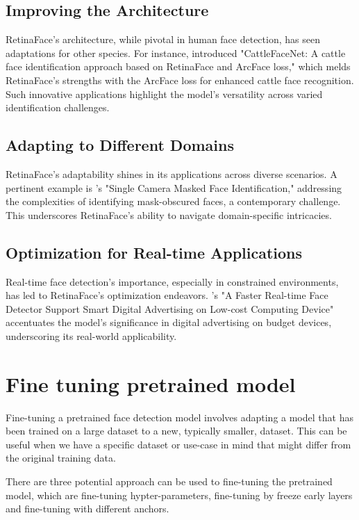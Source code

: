 \documentclass{article}
\begin{document}
\subsection{Improving the Architecture}
RetinaFace's architecture, while pivotal in human face detection, has seen adaptations for other species. For instance, \cite{xu2022cattlefacenet} introduced "CattleFaceNet: A cattle face identification approach based on RetinaFace and ArcFace loss," which melds RetinaFace's strengths with the ArcFace loss for enhanced cattle face recognition. Such innovative applications highlight the model's versatility across varied identification challenges.

\subsection{Adapting to Different Domains}
RetinaFace's adaptability shines in its applications across diverse scenarios. A pertinent example is \cite{aswal2020single}'s "Single Camera Masked Face Identification," addressing the complexities of identifying mask-obscured faces, a contemporary challenge. This underscores RetinaFace's ability to navigate domain-specific intricacies.

\subsection{Optimization for Real-time Applications}
Real-time face detection's importance, especially in constrained environments, has led to RetinaFace's optimization endeavors. \cite{putro2022faster}'s "A Faster Real-time Face Detector Support Smart Digital Advertising on Low-cost Computing Device" accentuates the model's significance in digital advertising on budget devices, underscoring its real-world applicability.

\section{Fine tuning pretrained model}

Fine-tuning a pretrained face detection model involves adapting a model that has been trained on a large dataset to a new, typically smaller, dataset. 
This can be useful when we have a specific dataset or use-case in mind that might differ from the original training data. 

There are three potential approach can be used to fine-tuning the pretrained model,
which are fine-tuning hypter-parameters, fine-tuning by freeze early layers and fine-tuning with different anchors.
\end{document}
